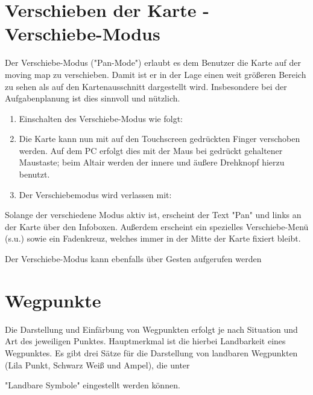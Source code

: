 \section{Verschieben der Karte - Verschiebe-Modus}

Der Verschiebe-Modus ("Pan-Mode") erlaubt es dem Benutzer die Karte auf der moving map zu verschieben. Damit ist er in der Lage einen weit größeren Bereich zu sehen als auf den Kartenausschnitt dargestellt wird. Insbesondere bei der Aufgabenplanung ist dies sinnvoll und nützlich.
\begin{enumerate}
\item Einschalten des Verschiebe-Modus wie folgt:
\begin{quote}
\blink{}
\end{quote}
\item Die Karte kann nun mit auf den Touchscreen gedrückten Finger verschoben werden. Auf dem \textsf{PC}  erfolgt dies mit der Maus bei gedrückt gehaltener Maustaste; beim Altair werden der innere und äußere Drehknopf hierzu benutzt.
\item Der Verschiebemodus wird verlassen mit:
\begin{quote}
\end{quote}
\end{enumerate}

Solange der verschiedene Modus aktiv ist, erscheint der Text "Pan" und links an der Karte über den Infoboxen. Außerdem erscheint ein spezielles Verschiebe-Menü (s.u.) sowie ein Fadenkreuz, welches immer in der Mitte der Karte fixiert bleibt.

Der Verschiebe-Modus kann ebenfalls über Gesten aufgerufen werden 
\section{Wegpunkte} \label{sec:waypoint-schemes}
Die Darstellung und Einfärbung von Wegpunkten erfolgt je nach Situation und Art des jeweiligen Punktes. Hauptmerkmal ist die hierbei Landbarkeit eines Wegpunktes.  Es gibt drei Sätze für die Darstellung von landbaren Wegpunkten  (Lila Punkt, Schwarz Weiß und Ampel), die unter
\begin{quote}
\blink{}\blink{}\blink{}
\end{quote}  "Landbare Symbole" eingestellt werden können.

